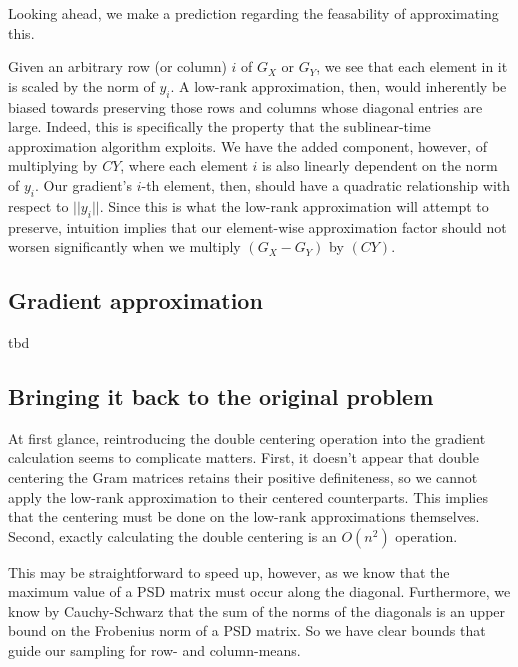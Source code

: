\documentclass{article}
\theoremstyle{definition}
\begin{document}
Looking ahead, we make a prediction regarding the feasability of approximating this.

Given an arbitrary row (or column) $i$ of $G_X$ or $G_Y$, we see that each element in it is scaled by the norm of $y_i$. A low-rank approximation, then,
would inherently be biased towards preserving those rows and columns whose diagonal entries are large. Indeed, this is specifically the property that the
sublinear-time approximation algorithm exploits. We have the added component, however, of multiplying by $CY$, where each element $i$ is also linearly dependent
on the norm of $y_i$.
Our gradient's $i$-th element, then, should have a quadratic relationship with respect to $||y_i||$. Since this is what the low-rank approximation will
attempt to preserve, intuition implies that our element-wise approximation factor should not worsen significantly when we multiply $(G_X - G_Y)$ by $(CY)$.

\subsection{Gradient approximation}
tbd

\subsection{Bringing it back to the original problem}
At first glance, reintroducing the double centering operation into the gradient calculation seems to complicate matters. First, it doesn't appear
that double centering the Gram matrices retains their positive definiteness, so we cannot apply the low-rank approximation to their centered counterparts. This
implies that the centering must be done on the low-rank approximations themselves. Second, exactly calculating the double centering is an $O(n^2)$ operation.

This may be straightforward to speed up, however, as we know that the maximum value of a PSD matrix must occur along the diagonal. Furthermore, we know by
Cauchy-Schwarz that the sum of the norms of the diagonals is an upper bound on the Frobenius norm of a PSD matrix. So we have clear bounds that guide
our sampling for row- and column-means.
\end{document}
